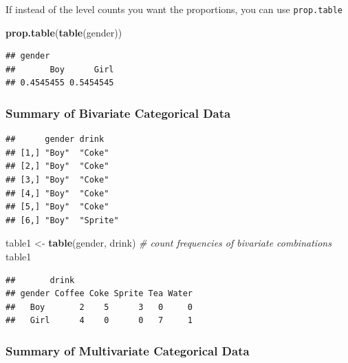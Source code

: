 \documentclass[]{book}
\newenvironment{Shaded}{\begin{snugshade}}{\end{snugshade}}
\newcommand{\KeywordTok}[1]{\textcolor[rgb]{0.13,0.29,0.53}{\textbf{#1}}}
\newcommand{\StringTok}[1]{\textcolor[rgb]{0.31,0.60,0.02}{#1}}
\newcommand{\CommentTok}[1]{\textcolor[rgb]{0.56,0.35,0.01}{\textit{#1}}}
\newcommand{\OperatorTok}[1]{\textcolor[rgb]{0.81,0.36,0.00}{\textbf{#1}}}
\newcommand{\NormalTok}[1]{#1}
\theoremstyle{definition}
\theoremstyle{definition}
\theoremstyle{definition}
\theoremstyle{remark}
\begin{document}
If instead of the level counts you want the proportions, you can use
\texttt{prop.table}

\begin{Shaded}
\begin{Highlighting}[]
\KeywordTok{prop.table}\NormalTok{(}\KeywordTok{table}\NormalTok{(gender))}
\end{Highlighting}
\end{Shaded}

\begin{verbatim}
## gender
##       Boy      Girl 
## 0.4545455 0.5454545
\end{verbatim}

\subsubsection{Summary of Bivariate Categorical
Data}\label{summary-of-bivariate-categorical-data}

\begin{Shaded}
\end{Shaded}

\begin{verbatim}
##      gender drink   
## [1,] "Boy"  "Coke"  
## [2,] "Boy"  "Coke"  
## [3,] "Boy"  "Coke"  
## [4,] "Boy"  "Coke"  
## [5,] "Boy"  "Coke"  
## [6,] "Boy"  "Sprite"
\end{verbatim}

\begin{Shaded}
\begin{Highlighting}[]
\NormalTok{table1 <-}\StringTok{ }\KeywordTok{table}\NormalTok{(gender, drink) }\CommentTok{# count frequencies of bivariate combinations}
\NormalTok{table1                                      }
\end{Highlighting}
\end{Shaded}

\begin{verbatim}
##       drink
## gender Coffee Coke Sprite Tea Water
##   Boy       2    5      3   0     0
##   Girl      4    0      0   7     1
\end{verbatim}

\subsubsection{Summary of Multivariate Categorical
Data}\label{summary-of-multivariate-categorical-data}
\end{document}
